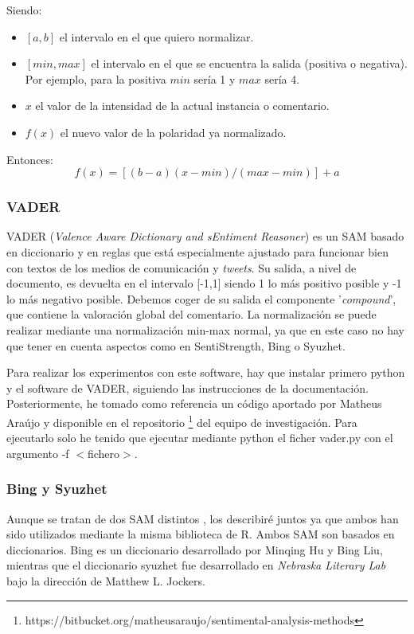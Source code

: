 Siendo:
\begin{itemize}
	\item $[a,b]$ el intervalo en el que quiero normalizar.
	\item $[min, max]$ el intervalo en el que se encuentra la salida (positiva o negativa). Por ejemplo, para la positiva $min$ sería 1 y $max$ sería 4.
	\item $x$ el valor de la intensidad de la actual instancia o comentario.
	\item $f(x)$ el nuevo valor de la polaridad ya normalizado.
\end{itemize}

Entonces:
$$ f(x) = [ (b-a)(x-min) / (max - min) ] + a$$

\subsubsection{VADER}
VADER \cite{vader} (\textit{Valence Aware Dictionary and sEntiment Reasoner}) es un SAM basado en diccionario y en reglas que está especialmente ajustado para funcionar bien con textos de los medios de comunicación y \textit{tweets}. Su salida, a nivel de documento, es devuelta en el intervalo [-1,1] siendo 1 lo más positivo posible y -1 lo más negativo posible. Debemos coger de su salida el componente '\textit{compound}', que contiene la valoración global del comentario. La normalización se puede realizar mediante una normalización min-max normal, ya que en este caso no hay que tener en cuenta aspectos como en SentiStrength, Bing o Syuzhet.

Para realizar los experimentos con este software, hay que instalar primero python y el software de VADER, siguiendo las instrucciones de la documentación. Posteriormente, he tomado como referencia un código aportado por Matheus Araújo y disponible en el repositorio \footnote{https://bitbucket.org/matheusaraujo/sentimental-analysis-methods} del equipo de investigación. Para ejecutarlo solo he tenido que ejecutar mediante python el ficher vader.py con el argumento -f $<$fichero$>$.

\subsubsection{Bing y Syuzhet}
Aunque se tratan de dos SAM distintos \cite{syuzhet}, los describiré juntos ya que ambos han sido utilizados mediante la misma biblioteca de R. Ambos SAM son basados en diccionarios. Bing es un diccionario desarrollado por Minqing Hu y Bing Liu, mientras que el diccionario syuzhet fue desarrollado en \textit{Nebraska Literary Lab} bajo la dirección de Matthew L. Jockers.

